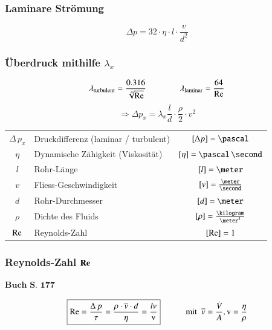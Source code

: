 \subsubsection{Laminare Strömung}

$$ \boxed{ \Delta p = 32 \cdot \eta \cdot l \cdot \frac{v}{d^2} }  $$


\subsubsection[Überdruck mithilfe]{Überdruck mithilfe $\lambda_x$}

$$ \lambda_{\rm turbulent} = \frac{0.316}{\sqrt[4]{\mathop{} \! \mathrm{Re}}}  \qquad \qquad \lambda_{\rm laminar} = \frac{64}{\mathop{} \! \mathrm{Re}} $$
$$ \boxed{ \Rightarrow \Delta p_x = \lambda_x \frac{l}{d} \cdot \frac{\rho}{2} \cdot v^2 } $$


\begin{tabular}{c l c}
	$\Delta \, p_x$ & Druckdifferenz (laminar / turbulent)  & $[\Delta p] = \pascal$                \\
	$\eta$          & Dynamische Zähigkeit (Viskosität)     & $[\eta] = \pascal \, \second$         \\
	$l$             & Rohr-Länge                            & $[l] = \meter$                        \\
	$v$             & Fliess-Geschwindigkeit                & $[v] = \frac{\meter}{\second}$        \\
	$d$             & Rohr-Durchmesser                      & $[d] = \meter$                        \\		
	$\rho$          & Dichte des Fluids                     & $[\rho] = \frac{\kilogram}{\meter^3}$ \\
	$\mathop{} \! \mathrm{Re}$          & Reynolds-Zahl                         & $[\mathop{} \! \mathrm{Re}] = 1$
\end{tabular}


\subsubsection[Reynolds-Zahl]{Reynolds-Zahl $\bm{\mathop{} \! \mathrm{Re}}$}
\begin{flushright}
	$\boxed{\textbf{Buch S. 177}}$
\end{flushright}

$$ \boxed{ \mathop{} \! \mathrm{Re} = \frac{\Delta \, p}{\tau} = \frac{\rho \cdot \overline{v} \cdot d}{\eta} = \frac{l v}{\text{v}}} \qquad \quad \text{mit } \; \overline{v} = \frac{\dot{V}}{A} , \text{v} = \frac{\eta}{\rho} $$


